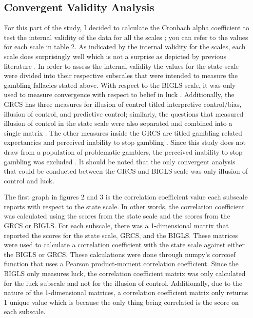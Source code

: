 \documentclass[twoside,twocolumn]{article}
\begin{document}
\subsection{Convergent Validity Analysis}
For this part of the study, I decided to calculate the Cronbach alpha coefficient to test the internal validity of the data for all the scales \cite{cronbach}; you can refer to the values for each scale in table 2. As indicated by the internal validity for the scales, each scale does surprisingly well which is not a surprise as depicted by previous literature \cite{Leonard:2015}. In order to assess the internal validity the values for the state scale were divided into their respective subscales that were intended to measure the gambling fallacies stated above. With respect to the BIGLS scale, it was only used to measure convergence with respect to belief in luck \cite{darke:1997}. Additionally, the GRCS has three measures for illusion of control titled interpretive control/bias, illusion of control, and predictive control; similarly, the questions that measured illusion of control in the state scale were also separated and combined into a single matrix \cite{raylu:2004}. The other measures inside the GRCS are titled gambling related expectancies and perceived inability to stop gambling \cite{raylu:2004}. Since this study does not draw from a population of problematic gamblers, the perceived inability to stop gambling was excluded \cite{raylu:2004}. It should be noted that the only convergent analysis that could be conducted between the GRCS and BIGLS scale was only illusion of control and luck.

The first graph in figures 2 and 3 is the correlation coefficient value each subscale reports  with respect to the state scale. In other words, the correlation coefficient was calculated using the scores from the state scale and the scores from the GRCS or BIGLS. For each subscale, there was a 1-dimensional matrix that reported the scores for the state scale, GRCS, and the BIGLS. These matrices were used to calculate a correlation coefficient with the state scale against either the BIGLS or GRCS. These calculations were done through numpy's corrcoef function that uses a Pearson product-moment correlation coefficient. Since the BIGLS only measures luck, the correlation coefficient matrix was only calculated for the luck subscale and not for the illusion of control. Additionally, due to the nature of the 1-dimensional matrices, a correlation coefficient matrix only returns 1 unique value which is because the only thing being correlated is the score on each subscale.
\end{document}
